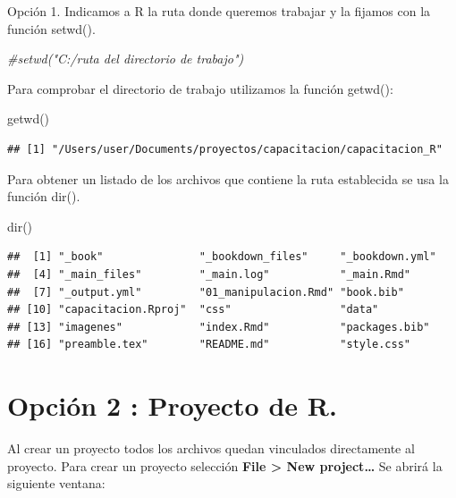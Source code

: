 \documentclass[
]{book}
\newenvironment{Shaded}{\begin{snugshade}}{\end{snugshade}}
\newcommand{\CommentTok}[1]{\textcolor[rgb]{0.56,0.35,0.01}{\textit{#1}}}
\newcommand{\FunctionTok}[1]{\textcolor[rgb]{0.00,0.00,0.00}{#1}}
\newcommand{\NormalTok}[1]{#1}
\begin{document}
Opción 1. Indicamos a R la ruta donde queremos trabajar y la fijamos con la función setwd().

\begin{Shaded}
\begin{Highlighting}[]
\CommentTok{\#setwd("C:/ruta del directorio de trabajo")}
\end{Highlighting}
\end{Shaded}

Para comprobar el directorio de trabajo utilizamos la función getwd():

\begin{Shaded}
\begin{Highlighting}[]
\FunctionTok{getwd}\NormalTok{()}
\end{Highlighting}
\end{Shaded}

\begin{verbatim}
## [1] "/Users/user/Documents/proyectos/capacitacion/capacitacion_R"
\end{verbatim}

Para obtener un listado de los archivos que contiene la ruta establecida se usa la función dir().

\begin{Shaded}
\begin{Highlighting}[]
\FunctionTok{dir}\NormalTok{()}
\end{Highlighting}
\end{Shaded}

\begin{verbatim}
##  [1] "_book"               "_bookdown_files"     "_bookdown.yml"      
##  [4] "_main_files"         "_main.log"           "_main.Rmd"          
##  [7] "_output.yml"         "01_manipulacion.Rmd" "book.bib"           
## [10] "capacitacion.Rproj"  "css"                 "data"               
## [13] "imagenes"            "index.Rmd"           "packages.bib"       
## [16] "preamble.tex"        "README.md"           "style.css"
\end{verbatim}

\hypertarget{opciuxf3n-2-proyecto-de-r.}{%
\section{Opción 2 : Proyecto de R.}\label{opciuxf3n-2-proyecto-de-r.}}

Al crear un proyecto todos los archivos quedan vinculados directamente al proyecto. Para crear un proyecto selección \textbf{File \textgreater{} New project\ldots{}} Se abrirá la siguiente ventana:
\end{document}
